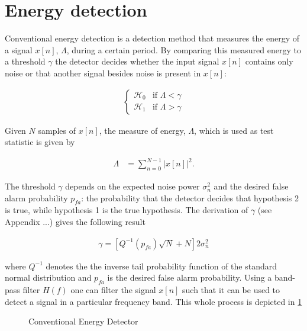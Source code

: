 \documentclass[a4paper, openany, oneside]{memoir}
\begin{document}
\section{Energy detection}
Conventional energy detection is a detection method that measures the energy of a signal $x[n]$, $\Lambda$, during a certain period. By comparing this measured energy to a threshold $\gamma$ the detector decides whether the input signal $x[n]$ contains only noise or that another signal besides noise is present in $x[n]$:

\begin{align*}
	\begin{cases}
		\mathcal{H}_0 & \text{if } \Lambda < \gamma \\
		\mathcal{H}_1 & \text{if } \Lambda > \gamma
	\end{cases}
\end{align*}
 
Given $N$ samples of $x[n]$, the measure of energy, $\Lambda$, which is used as test statistic is given by 

\begin{align}\label{eq:test_ed}
	\Lambda &= \sum_{n=0}^{N-1} |x[n]|^2.
\end{align}

The threshold $\gamma$ depends on the expected noise power $\sigma_n^2$ and the desired false alarm probability $p_{fa}$: the probability that the detector decides that hypothesis 2 is true, while hypothesis 1 is the true hypothesis. The derivation of $\gamma$ (see Appendix ...) gives the following result

\begin{align*}
\gamma = \left[Q^{-1}(p_{fa})\sqrt{N} + N\right]2\sigma_n^2
\end{align*}

where $Q^{-1}$ denotes the the inverse tail probability function of the standard normal distribution and $p_{fa}$ is the desired false alarm probability.
Using a band-pass filter $H(f)$ one can filter the signal $x[n]$ such that it can be used to detect a signal in a particular frequency band. This whole process is depicted
in \cref{tkz:conv_ed}
\begin{figure}[H]
\centering
{}
\caption{Conventional Energy Detector}\label{tkz:conv_ed}
\end{figure}
\end{document}
